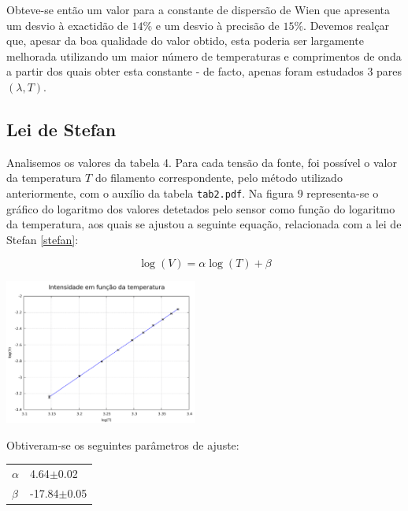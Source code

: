 \documentclass[9pt]{extarticle}
\begin{document}
\begin{multicols}{2}
\par Obteve-se então um valor para a constante de dispersão de Wien que apresenta um desvio à exactidão de $14\%$ e um desvio à precisão de $15\%$. Devemos realçar que, apesar da boa qualidade do valor obtido, esta poderia ser largamente melhorada utilizando um maior número de temperaturas e comprimentos de onda a partir dos quais obter esta constante - de facto, apenas foram estudados 3 pares $(\lambda,T)$.

\subsection{Lei de Stefan}

\par Analisemos os valores da tabela 4. Para cada tensão da fonte, foi possível o valor da temperatura $T$ do filamento correspondente, pelo método utilizado anteriormente, com o auxílio da tabela \verb|tab2.pdf|. Na figura 9 representa-se o gráfico do logaritmo dos valores detetados pelo sensor como função do logaritmo da temperatura, aos quais se ajustou a seguinte equação, relacionada com a lei de Stefan \eqref{stefan}:

\begin{equation} \label{stefanP}
\log(V)=\alpha\log(T)+\beta
\end{equation}

\begin{center}
\includegraphics[width=180pt]{stefan.pdf}
\par{}
\end{center}

\par Obtiveram-se os seguintes parâmetros de ajuste:

{\small
\begin{center}
\begin{tabular}{ x{1.2cm} x{2.4cm} }
\hline \hline
$\alpha$ & 4.64$\pm$0.02 \tabularnewline
$\beta$  & -17.84$\pm$0.05 \tabularnewline
\hline \hline
\end{tabular}
\end{center}
}


\end{multicols}
\end{document}
